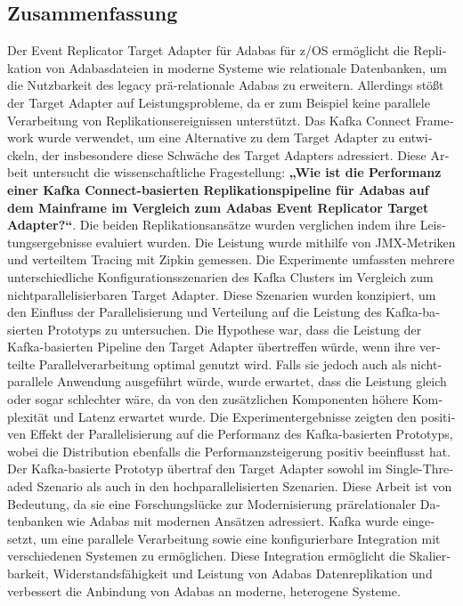 \begin{otherlanguage}{ngerman}
	\chapter*{Zusammenfassung}
    Der Event Replicator Target Adapter für Adabas für z/OS ermöglicht die Replikation von Adabasdateien in moderne Systeme wie relationale Datenbanken, um die Nutzbarkeit des legacy prä-relationale Adabas zu erweitern. Allerdings stößt der Target Adapter auf Leistungsprobleme, da er zum Beispiel keine parallele Verarbeitung von Replikationsereignissen unterstützt. Das Kafka Connect Framework wurde verwendet, um eine Alternative zu dem Target Adapter zu entwickeln, der insbesondere diese Schwäche des Target Adapters adressiert.
    Diese Arbeit untersucht die wissenschaftliche Fragestellung: \textbf{„Wie ist die Performanz einer Kafka Connect-basierten Replikationspipeline für Adabas auf dem Mainframe im Vergleich zum Adabas Event Replicator Target Adapter?“}. Die beiden Replikationsansätze wurden verglichen indem ihre Leistungsergebnisse evaluiert wurden. Die Leistung wurde mithilfe von JMX-Metriken und verteiltem Tracing mit Zipkin gemessen. Die Experimente umfassten mehrere unterschiedliche Konfigurationsszenarien des Kafka Clusters im Vergleich zum nichtparallelisierbaren Target Adapter. Diese Szenarien wurden konzipiert, um den Einfluss der Parallelisierung und Verteilung auf die Leistung des Kafka-basierten Prototyps zu untersuchen.
    Die Hypothese war, dass die Leistung der Kafka-basierten Pipeline den Target Adapter übertreffen würde, wenn ihre verteilte Parallelverarbeitung optimal genutzt wird. Falls sie jedoch auch als nicht-parallele Anwendung ausgeführt würde, wurde erwartet, dass die Leistung gleich oder sogar schlechter wäre, da von den zusätzlichen Komponenten höhere Komplexität und Latenz erwartet wurde. Die Experimentergebnisse zeigten den positiven Effekt der Parallelisierung auf die Performanz des Kafka-basierten Prototyps, wobei die Distribution ebenfalls die Performanzsteigerung positiv beeinflusst hat. Der Kafka-basierte Prototyp übertraf den Target Adapter sowohl im Single-Threaded Szenario als auch in den hochparallelisierten Szenarien.
    Diese Arbeit ist von Bedeutung, da sie eine Forschungslücke zur Modernisierung prärelationaler Datenbanken wie Adabas mit modernen Ansätzen adressiert. Kafka wurde eingesetzt, um eine parallele Verarbeitung sowie eine konfigurierbare Integration mit verschiedenen Systemen zu ermöglichen. Diese Integration ermöglicht die Skalierbarkeit, Widerstandsfähigkeit und Leistung von Adabas Datenreplikation und verbessert die Anbindung von Adabas an moderne, heterogene Systeme.

\end{otherlanguage}

